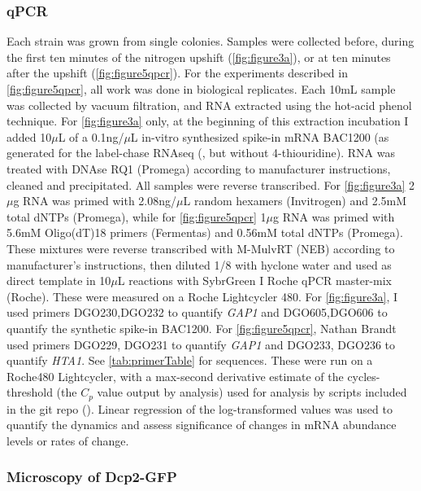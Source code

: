 \subsubsection{qPCR}

Each strain was grown from single colonies.
Samples were collected before, during the first ten minutes of
the nitrogen upshift (\autoref{fig:figure3a}),
or at ten minutes after the upshift (\autoref{fig:figure5qpcr}).
For the experiments described in
\autoref{fig:figure5qpcr}, all work
was done in biological replicates.
Each 10mL sample was collected by vacuum filtration, and RNA extracted
using the hot-acid phenol technique.
For \autoref{fig:figure3a} only, at the beginning of this extraction 
incubation I added 10$\mu$L of a 0.1ng/$\mu$L in-vitro synthesized 
spike-in mRNA BAC1200 (as generated
for the label-chase RNAseq (,
but without 4-thiouridine). 
RNA was treated with DNAse RQ1 (Promega) according to manufacturer
instructions, cleaned and precipitated.
All samples were reverse transcribed. 
For \autoref{fig:figure3a} 2$\mu$g RNA was primed with 2.08ng/$\mu$L
random hexamers (Invitrogen) and 2.5mM total dNTPs (Promega),
while for \autoref{fig:figure5qpcr} 1$\mu$g RNA was primed with 
5.6mM Oligo(dT)18 primers (Fermentas) and
0.56mM total dNTPs (Promega).
These mixtures were reverse transcribed with M-MulvRT (NEB) according
to manufacturer's instructions, then diluted 1/8 with hyclone water 
and used as direct template in 10$\mu$L reactions with SybrGreen I 
Roche qPCR master-mix (Roche). These were measured
on a Roche Lightcycler 480. 
For \autoref{fig:figure3a}, I used primers 
DGO230,DGO232 to quantify \textit{GAP1} and 
DGO605,DGO606 to quantify the synthetic spike-in BAC1200.
For \autoref{fig:figure5qpcr}, Nathan Brandt used primers
DGO229, DGO231 to quantify \textit{GAP1} and
DGO233, DGO236 to quantify \textit{HTA1}.  
See \autoref{tab:primerTable} for sequences.
These were run on a Roche480 Lightcycler, 
with a max-second derivative estimate
of the cycles-threshold (the $C_p$ value output by analysis) used 
for analysis by scripts included in the git repo 
().
Linear regression of the log-transformed values was used to quantify
the dynamics and assess significance of changes in mRNA abundance
levels or rates of change.

\subsubsection{Microscopy of Dcp2-GFP}

